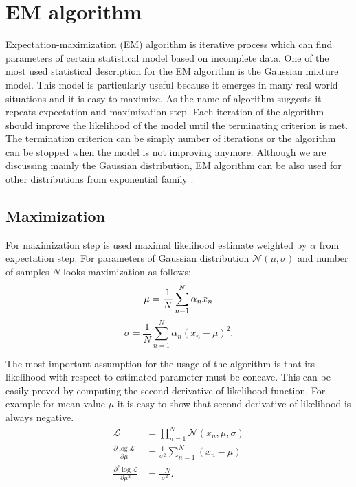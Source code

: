 \section{EM algorithm}
Expectation-maximization (EM) algorithm is iterative process which can find parameters of certain statistical model based on incomplete data. One of the most used statistical description for the EM algorithm is the Gaussian mixture model. This model is particularly useful because it emerges in many real world situations and it is easy to maximize. As the name of algorithm suggests it repeats expectation and maximization step. Each iteration of the algorithm should improve the likelihood of the model until the terminating criterion is met. The termination criterion can be simply number of iterations or the algorithm can be stopped when the model is not improving anymore. Although we are discussing mainly the Gaussian distribution, EM algorithm can be also used for other distributions from exponential family
 \cite{dempster1977}. 
 
 \subsection{Maximization}
For maximization step is used maximal likelihood estimate weighted by $\alpha$ from expectation step. For parameters of Gaussian distribution $\mathcal{N}(\mu, \sigma)$ and number of samples $N$ looks maximization as follows:
\begin{equation}
\mu = \frac{1}{N} \sum_{n = 1}^{N} \alpha_n x_n \\
\end{equation}
\begin{equation}
\sigma = \frac{1}{N} \sum_{n = 1}^{N}\alpha_n (x_n - \mu)^2.
\end{equation}

The most important assumption for the usage of the algorithm is that its likelihood with respect to estimated parameter must be concave. This can be easily proved by computing the second derivative of likelihood function. For example for mean value $\mu$ it is easy to show that second derivative of likelihood is always negative.
\begin{align}
\mathcal{L} &= \prod_{n=1}^N \mathcal{N}(x_n, \mu, \sigma) \\
\frac{\partial \log \mathcal{L}}{\partial \mu} &= \frac{1}{\sigma^2} \sum_{n = 1}^{N} (x_n - \mu) \\
\frac{\partial^2 \log \mathcal{L}}{\partial \mu^2} &= \frac{-N}{\sigma^2}.
\end{align}

